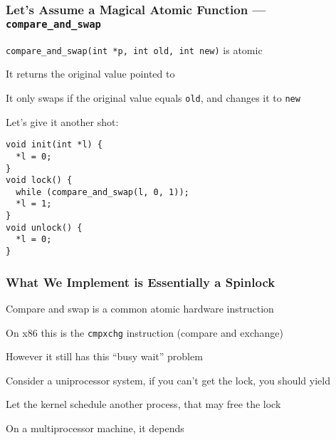   \begin{frame}[fragile]
    \frametitle{Let's Assume a Magical Atomic Function ---
                \texttt{compare\_and\_swap}}

    \texttt{compare\_and\_swap(int *p, int old, int new)} is atomic

    \hspace{2em} It returns the original value pointed to

    \hspace{2em} It only swaps if the original value equals \texttt{old}, and changes it to \texttt{new}

    \vspace{2em}

    Let's give it another shot:

    \begin{lstlisting}
void init(int *l) {
  *l = 0;
}
void lock() {
  while (compare_and_swap(l, 0, 1));
  *l = 1;
}
void unlock() {
  *l = 0;
}   
    \end{lstlisting}
  \end{frame}

  \begin{frame}
    \frametitle{What We Implement is Essentially a Spinlock}

    Compare and swap is a common atomic hardware instruction

    \vspace{2em}

    On x86 this is the \texttt{cmpxchg} instruction (compare and exchange)

    \vspace{2em}

    However it still has this ``busy wait'' problem

    \vspace{2em}

    Consider a uniprocessor system, if you can't get the lock, you should yield

    \hspace{2em} Let the kernel schedule another process, that may free the lock

    \vspace{2em}

    On a multiprocessor machine, it depends
  \end{frame}


